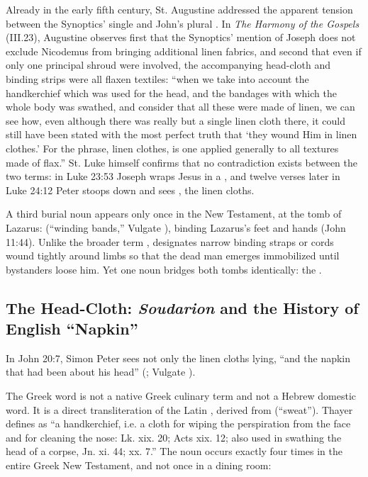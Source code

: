 Already in the early fifth century, St. Augustine addressed the apparent tension between the Synoptics' single  and John's plural . In \emph{The Harmony of the Gospels} (III.23), Augustine observes first that the Synoptics' mention of Joseph does not exclude Nicodemus from bringing additional linen fabrics, and second that even if only one principal shroud were involved, the accompanying head-cloth and binding strips were all flaxen textiles: ``when we take into account the handkerchief which was used for the head, and the bandages with which the whole body was swathed, and consider that all these were made of linen, we can see how, even although there was really but a single linen cloth there, it could still have been stated with the most perfect truth that `they wound Him in linen clothes.' For the phrase, linen clothes, is one applied generally to all textures made of flax.'' St. Luke himself confirms that no contradiction exists between the two terms: in Luke 23:53 Joseph wraps Jesus in a , and twelve verses later in Luke 24:12 Peter stoops down and sees , the linen cloths.

A third burial noun appears only once in the New Testament, at the tomb of Lazarus:  (``winding bands,'' Vulgate ), binding Lazarus's feet and hands (John 11:44). Unlike the broader term ,  designates narrow binding straps or cords wound tightly around limbs so that the dead man emerges immobilized until bystanders loose him. Yet one noun bridges both tombs identically: the .

\subsection{The Head-Cloth: \emph{Soudarion} and the History of English ``Napkin''}

In John 20:7, Simon Peter sees not only the linen cloths lying, ``and the napkin that had been about his head'' (; Vulgate ).

The Greek word  is not a native Greek culinary term and not a Hebrew domestic word. It is a direct transliteration of the Latin , derived from  (``sweat''). Thayer defines  as ``a handkerchief, i.e. a cloth for wiping the perspiration from the face and for cleaning the nose: Lk. xix. 20; Acts xix. 12; also used in swathing the head of a corpse, Jn. xi. 44; xx. 7.'' The noun occurs exactly four times in the entire Greek New Testament, and not once in a dining room:

